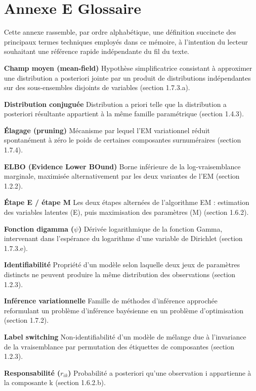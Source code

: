 \section*{Annexe E  Glossaire}
Cette annexe rassemble, par ordre alphabétique, une définition succincte des principaux termes techniques employés dans ce mémoire, à l'intention du lecteur souhaitant une référence rapide indépendante du fil du texte.

\textbf{Champ moyen (mean-field)  }Hypothèse simplificatrice consistant à approximer une distribution a posteriori jointe par un produit de distributions indépendantes sur des sous-ensembles disjoints de variables (section 1.7.3.a).

\textbf{Distribution conjuguée  }Distribution a priori telle que la distribution a posteriori résultante appartient à la même famille paramétrique (section 1.4.3).

\textbf{Élagage (pruning)  }Mécanisme par lequel l'EM variationnel réduit spontanément à zéro le poids de certaines composantes surnuméraires (section 1.7.4).

\textbf{ELBO (Evidence Lower BOund)  }Borne inférieure de la log-vraisemblance marginale, maximisée alternativement par les deux variantes de l'EM (section 1.2.2).

\textbf{Étape E / étape M  }Les deux étapes alternées de l'algorithme EM : estimation des variables latentes (E), puis maximisation des paramètres (M) (section 1.6.2).

\textbf{Fonction digamma ($\psi $)  }Dérivée logarithmique de la fonction Gamma, intervenant dans l'espérance du logarithme d'une variable de Dirichlet (section 1.7.3.e).

\textbf{Identifiabilité  }Propriété d'un modèle selon laquelle deux jeux de paramètres distincts ne peuvent produire la même distribution des observations (section 1.2.3).

\textbf{Inférence variationnelle  }Famille de méthodes d'inférence approchée reformulant un problème d'inférence bayésienne en un problème d'optimisation (section 1.7.2).

\textbf{Label switching  }Non-identifiabilité d'un modèle de mélange due à l'invariance de la vraisemblance par permutation des étiquettes de composantes (section 1.2.3).

\textbf{Responsabilité ($r_{ik}$)  }Probabilité a posteriori qu'une observation i appartienne à la composante k (section 1.6.2.b).

